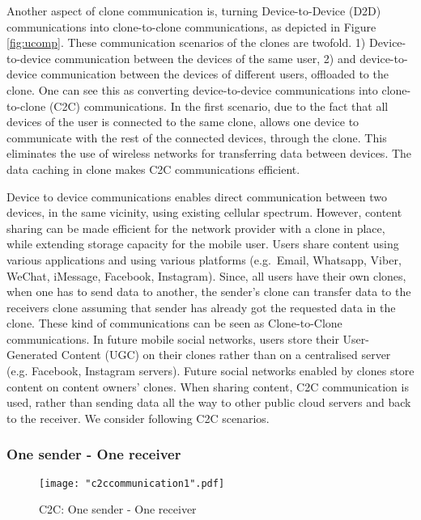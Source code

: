 \documentclass[12pt,journal,compsoc, onecolumn]{IEEEtran}
\begin{document}
Another aspect of clone communication\cite{kosta2012clone2clone} is, turning Device-to-Device (D2D) communications into clone-to-clone communications, as depicted in Figure \ref{fig:ucomp}. These communication scenarios of the clones are twofold. 1) Device-to-device communication between the devices of the same user, 2) and device-to-device communication between the devices of different users, offloaded to the clone. One can see this as converting device-to-device communications into clone-to-clone (C2C) communications. In the first scenario, due to the fact that all devices of the user is connected to the same clone, allows one device to communicate with the rest of the connected devices, through the clone. This eliminates the use of wireless networks for transferring data between devices. The data caching in clone makes C2C communications efficient. 

Device to device communications enables direct communication between two devices, in the same vicinity, using existing cellular spectrum. However,  content sharing can be made efficient for the network provider with a clone in place, while extending storage capacity for the mobile user. Users share content using various applications and using various platforms (e.g.\ Email, Whatsapp, Viber, WeChat, iMessage, Facebook, Instagram). Since, all users have their own clones, when one has to send data to another, the sender's clone can transfer data to the receivers clone assuming that sender has already got the requested data in the clone. These kind of communications can be seen as Clone-to-Clone  communications. In future mobile social networks, users store their User-Generated Content (UGC) on their clones rather than on a centralised server (e.g. Facebook, Instagram servers). Future social networks enabled by clones store content on content owners' clones. When sharing content, C2C communication is used, rather than sending data all the way to other public cloud servers and back to the receiver. We consider following C2C scenarios.



\subsubsection*{One sender - One receiver}

\begin{figure*}[ht]
\centering
\texttt{[image: "c2ccommunication1".pdf]}
\caption{\label{fig:c2c1} C2C: One sender - One receiver}
\end{figure*} 
\end{document}

